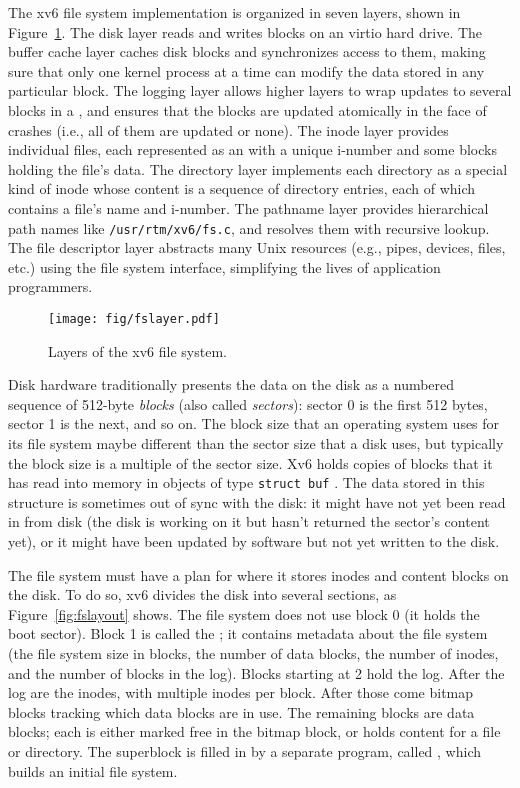 The xv6 file system implementation is
organized in seven layers, shown in 
Figure~\ref{fig:fslayer}.
The disk layer reads and writes blocks on an virtio hard drive.
The buffer cache layer caches disk blocks and synchronizes access to them,
making sure that only one kernel process at a time can modify the
data stored in any particular block.  The logging layer allows higher
layers to wrap updates to several blocks in a
,
and ensures that the blocks are updated atomically in the
face of crashes (i.e., all of them are updated or none).
The inode layer provides individual files, each represented as an
with a unique i-number
and some blocks holding the file's data.  The directory
layer implements each directory as a special kind of
inode whose content is a sequence of directory entries, each of which contains a
file's name and i-number.
The pathname layer provides
hierarchical path names like
\lstinline{/usr/rtm/xv6/fs.c},
and resolves them with recursive lookup.
The file descriptor layer abstracts many Unix resources (e.g., pipes, devices,
files, etc.) using the file system interface, simplifying the lives of
application programmers.

\begin{figure}[t]
\center
\texttt{[image: fig/fslayer.pdf]}
\caption{Layers of the xv6 file system.}
\label{fig:fslayer}
\end{figure}

Disk hardware traditionally presents the data on the
disk as a numbered sequence of 512-byte 
\textit{blocks} 
(also called 
\textit{sectors}): 
sector 0 is the first 512 bytes, sector 1 is the next, and so on. The block size
that an operating system uses for its file system maybe different than the
sector size that a disk uses, but typically the block size is a multiple of the
sector size. Xv6 holds copies of blocks that it has read into memory
in objects of type
\lstinline{struct buf}
.
The
data stored in this structure is sometimes out of sync with the disk: it might have
not yet been read in from disk (the disk is working on it but hasn't returned
the sector's content yet), or it might have been updated by software
but not yet written to the disk.

The file system must have a plan for where it stores inodes and
content blocks on the disk.
To do so, xv6 divides the disk into several
sections, as 
Figure~\ref{fig:fslayout} shows.
The file system does not use
block 0 (it holds the boot sector).  Block 1 is called the 
; 
it contains metadata about the file system (the file system size in blocks, the
number of data blocks, the number of inodes, and the number of blocks in the
log).  Blocks starting at 2 hold the log.  After the log are the inodes, with multiple inodes per block.  After
those come bitmap blocks tracking which data blocks are in use.
The remaining blocks are data blocks; each is either marked
free in the bitmap block, or holds content for a file or directory.
The superblock is filled in by a separate program, called
,
which builds an initial file system.

